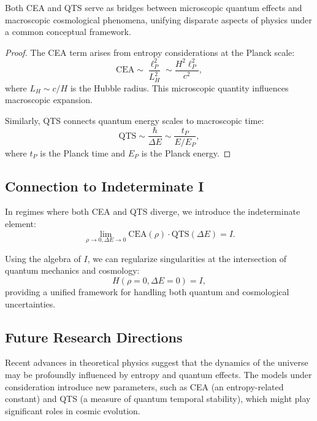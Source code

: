 \begin{theorem}
Both CEA and QTS serve as bridges between microscopic quantum effects and macroscopic cosmological phenomena, unifying disparate aspects of physics under a common conceptual framework.
\end{theorem}

\begin{proof}
The CEA term arises from entropy considerations at the Planck scale:
\[
\text{CEA} \sim \frac{\ell_P^2}{L_H^2} \sim \frac{H^2\ell_P^2}{c^2},
\]
where $L_H \sim c/H$ is the Hubble radius. This microscopic quantity influences macroscopic expansion.

Similarly, QTS connects quantum energy scales to macroscopic time:
\[
\text{QTS} \sim \frac{\hbar}{\Delta E} \sim \frac{t_P}{E/E_P},
\]
where $t_P$ is the Planck time and $E_P$ is the Planck energy.
\end{proof}

\subsection{Connection to Indeterminate I}

\begin{definition}
In regimes where both CEA and QTS diverge, we introduce the indeterminate element:
\[
\lim_{\rho \to 0, \Delta E \to 0} \text{CEA}(\rho) \cdot \text{QTS}(\Delta E) = I.
\]
\end{definition}

\begin{proposition}
Using the algebra of $I$, we can regularize singularities at the intersection of quantum mechanics and cosmology:
\[
H(\rho=0, \Delta E=0) = I,
\]
providing a unified framework for handling both quantum and cosmological uncertainties.
\end{proposition}

\subsection{Future Research Directions}

Recent advances in theoretical physics suggest that the dynamics of the universe may be profoundly influenced by entropy and quantum effects. The models under consideration introduce new parameters, such as CEA (an entropy-related constant) and QTS (a measure of quantum temporal stability), which might play significant roles in cosmic evolution.

